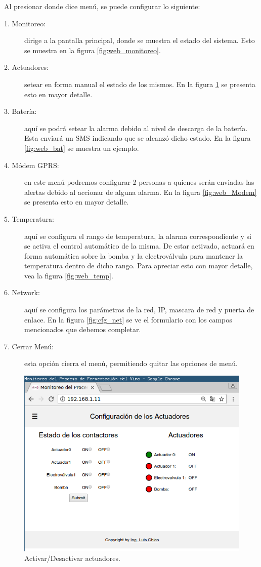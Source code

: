 Al presionar donde dice menú, se puede configurar lo siguiente:
\begin{description}
  \item[1. Monitoreo:] dirige a la pantalla principal, donde se muestra el estado del sistema. Esto se muestra en la figura \ref{fig:web_monitoreo}.
  \item[2. Actuadores:] setear en forma manual el estado de los mismos. En la figura \ref{fig:web_act} se presenta esto en mayor detalle.
  \item[3. Batería:] aquí se podrá setear la alarma debido al nivel de descarga de la batería. Esta enviará un SMS indicando que se alcanzó dicho estado. En la figura \ref{fig:web_bat} se muestra un ejemplo.
  \item[4. Módem GPRS:] en este menú podremos configurar 2 personas a quienes serán enviadas las alertas debido al accionar de alguna alarma. En la figura \ref{fig:web_Modem} se presenta esto en mayor detalle.
  \item[5. Temperatura:] aquí se configura el rango de temperatura, la alarma correspondiente y si se activa el control automático de la misma. De estar activado, actuará en forma automática sobre la bomba y la electroválvula para mantener la temperatura dentro de dicho rango. Para apreciar esto con mayor detalle, vea la figura \ref{fig:web_temp}.
  \item[6. Network:] aquí se configura los parámetros de la red, IP, mascara de red y puerta de enlace. En la figura \ref{fig:cfg_net} se ve el formulario con los campos mencionados que debemos completar.
  \item[7. Cerrar Menú:] esta opción cierra el menú, permitiendo quitar las opciones de menú.
\end{description}

\begin{figure}[h]
  \centering
  \includegraphics[scale=.35]{./Figures/config_act.png}
  \caption{ Activar/Desactivar actuadores.}
  \label{fig:web_act}
\end{figure}

